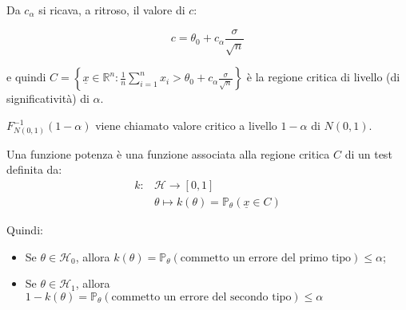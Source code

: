 \documentclass[hidelinks, 10pt]{report}
\begin{document}
\begin{es}
\begin{figure}[H]
\end{figure}

Da $ c_{\alpha} $ si ricava, a ritroso, il valore di $ c $:

\[ c = \theta_{0} + c_{\alpha} \frac{\sigma}{\sqrt{n}} \]

e quindi $ C = \left\{ \underline{x} \in \mathbb{R}^{n} : \frac{1}{n} \sum\limits_{i = 1}^{n} x_i > \theta_{0} + c_{\alpha} \frac{\sigma}{\sqrt{n}} \right\} $ \`e la regione critica di livello (di significativit\`a) di $ \alpha $.
\end{es}

\begin{defn}
$ F^{-1}_{N(0,1)} (1 - \alpha) $ viene chiamato valore critico a livello $ 1 - \alpha $ di $ N(0,1) $.
\end{defn}

\begin{defn}
Una funzione potenza \`e una funzione associata alla regione critica $ C $ di un test definita da:
\begin{align*}
k: & \mathcal{H} \to [0, 1] \\
  & \theta \mapsto k(\theta) = \mathbb{P}_{\theta} (\underline{x} \in C)
\end{align*}

Quindi:
\begin{itemize}
\item Se $ \theta \in \mathcal{H}_{0} $, allora $ k(\theta) = \mathbb{P}_{\theta} (\text{commetto un errore del primo tipo}) \le \alpha $;
\item Se $ \theta \in \mathcal{H}_{1} $, allora $ 1 - k(\theta) = \mathbb{P}_{\theta} (\text{commetto un errore del secondo tipo}) \le \alpha $
\end{itemize}
\end{defn}
\end{document}
